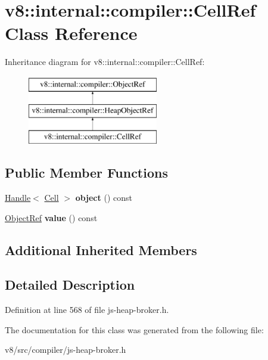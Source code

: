 \hypertarget{classv8_1_1internal_1_1compiler_1_1CellRef}{}\section{v8\+:\+:internal\+:\+:compiler\+:\+:Cell\+Ref Class Reference}
\label{classv8_1_1internal_1_1compiler_1_1CellRef}
Inheritance diagram for v8\+:\+:internal\+:\+:compiler\+:\+:Cell\+Ref\+:\begin{figure}[H]
\begin{center}
\leavevmode
\includegraphics[height=3.000000cm]{classv8_1_1internal_1_1compiler_1_1CellRef}
\end{center}
\end{figure}
\subsection*{Public Member Functions}
\begin{DoxyCompactItemize}
\item 
\mbox{\label{classv8_1_1internal_1_1compiler_1_1CellRef_a314dc059c1963b04878422722e6a52db}} 
\mbox{\hyperlink{classv8_1_1internal_1_1Handle}{Handle}}$<$ \mbox{\hyperlink{classv8_1_1internal_1_1Cell}{Cell}} $>$ {\bfseries object} () const
\item 
\mbox{\label{classv8_1_1internal_1_1compiler_1_1CellRef_a9852a669d5f2149e15cc7a4664d7fb88}} 
\mbox{\hyperlink{classv8_1_1internal_1_1compiler_1_1ObjectRef}{Object\+Ref}} {\bfseries value} () const
\end{DoxyCompactItemize}
\subsection*{Additional Inherited Members}


\subsection{Detailed Description}


Definition at line 568 of file js-\/heap-\/broker.\+h.



The documentation for this class was generated from the following file\+:\begin{DoxyCompactItemize}
\item 
v8/src/compiler/js-\/heap-\/broker.\+h\end{DoxyCompactItemize}
